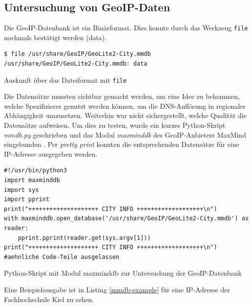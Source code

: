 \subsection{Untersuchung von \gls{GeoIP}-Daten}
Die \gls{GeoIP}-Datenbank ist ein Binärformat\cite{maxmind2021binary}. Dies konnte durch das Werkzeug \texttt{file} nochmals bestätigt werden (\glqq data\grqq{})\cite{filemanpage2021}.
\begin{listing}[h]
\begin{verbatim}
$ file /usr/share/GeoIP/GeoLite2-City.mmdb
/usr/share/GeoIP/GeoLite2-City.mmdb: data

\end{verbatim}
\caption{Auskunft über das Dateiformat mit \texttt{file}}
\label{file-geoip-db}
\end{listing}\FloatBarrier
Die Datensätze mussten \glqq sichtbar\grqq{} gemacht werden, um eine Idee zu bekommen, welche Spezifizierer genutzt werden können, um die \gls{DNS}-Auflösung in regionaler Abhängigkeit umzusetzen. Weiterhin war nicht sichergestellt, welche Qualität die Datensätze aufweisen. Um dies zu testen, wurde ein kurzes Python-Skript \textit{mmdb.py} geschrieben und das Modul \textit{maxminddb} des \gls{GeoIP}-Anbieters MaxMind eingebunden \cite{maxminddbreader2021}. Per \textit{pretty print} konnten die entsprechenden Datensätze für eine IP-Adresse ausgegeben werden.
\begin{listing}[h]
\begin{verbatim}
#!/usr/bin/python3
import maxminddb
import sys
import pprint
print("++++++++++++++++++++ CITY INFO +++++++++++++++++++\n")
with maxminddb.open_database('/usr/share/GeoIP/GeoLite2-City.mmdb') as reader:
    pprint.pprint(reader.get(sys.argv[1]))
print("++++++++++++++++++++ CITY INFO +++++++++++++++++++\n")
#aehnliche Code-Teile ausgelassen
\end{verbatim}
\caption{Python-Skript mit Modul maxminddb zur Untersuchung der GeoIP-Datenbank}
\label{python-mmdb-reader}
\end{listing}\FloatBarrier
\newpage
Eine Beispielausgabe ist in Listing \ref{mmdb-example} für eine IP-Adresse der Fachhochschule Kiel zu sehen.
